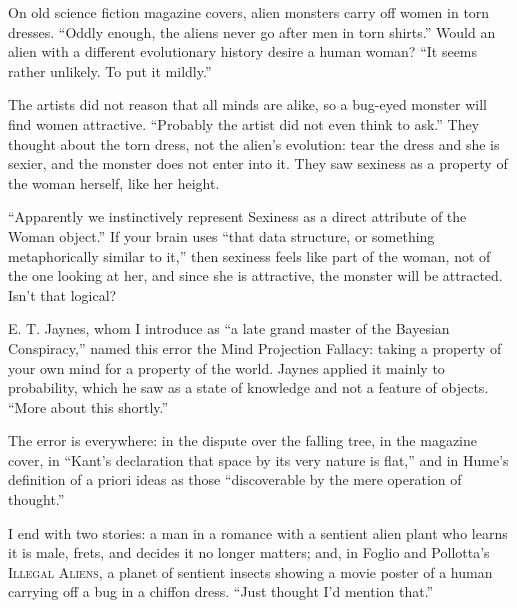 
On old science fiction magazine covers, alien monsters carry off women in torn dresses. ``Oddly enough, the aliens never go after men in torn shirts.'' Would an alien with a different evolutionary history desire a human woman? ``It seems rather unlikely. To put it mildly.''

The artists did not reason that all minds are alike, so a bug-eyed monster will find women attractive. ``Probably the artist did not even think to ask.'' They thought about the torn dress, not the alien's evolution: tear the dress and she is sexier, and the monster does not enter into it. They saw sexiness as a property of the woman herself, like her height. 

``Apparently we instinctively represent Sexiness as a direct attribute of the Woman object.'' If your brain uses ``that data structure, or something metaphorically similar to it,'' then sexiness feels like part of the woman, not of the one looking at her, and since she is attractive, the monster will be attracted. Isn't that logical?

E. T. Jaynes, whom I introduce as ``a late grand master of the Bayesian Conspiracy,'' named this error the Mind Projection Fallacy: taking a property of your own mind for a property of the world. Jaynes applied it mainly to probability, which he saw as a state of knowledge and not a feature of objects. ``More about this shortly.'' 

The error is everywhere: in the dispute over the falling tree, in the magazine cover, in ``Kant's declaration that space by its very nature is flat,'' and in Hume's definition of a priori ideas as those ``discoverable by the mere operation of thought.'' 

I end with two stories: a man in a romance with a sentient alien plant who learns it is male, frets, and decides it no longer matters; and, in Foglio and Pollotta's \textsc{Illegal Aliens}, a planet of sentient insects showing a movie poster of a human carrying off a bug in a chiffon dress. ``Just thought I'd mention that.''
